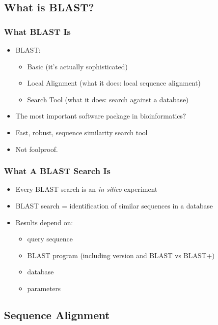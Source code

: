 \documentclass[table]{beamer}
\begin{document}
    \subsection{What is BLAST?}
    \begin{frame}
     \frametitle{What BLAST Is}
     \begin{itemize}
       \item<1-> BLAST:
       \begin{itemize}
         \item<1-> Basic (it's actually sophisticated)
         \item<1-> Local Alignment (what it does: local sequence alignment)
         \item<1-> Search Tool (what it does: search against a database)
       \end{itemize}
       \item<2-> The most important software package in bioinformatics?
       \item<2-> Fast, robust, sequence similarity search tool
       \item<2-> Not foolproof.
     \end{itemize}
    \end{frame}
  
    \begin{frame}
     \frametitle{What A BLAST Search Is}
     \begin{itemize}
       \item Every BLAST search is an \textit{in silico} experiment
       \item BLAST search = identification of similar sequences in a database
       \item Results depend on:
       \begin{itemize}
         \item query sequence
         \item BLAST program (including version and BLAST vs BLAST+)
         \item database
         \item parameters
       \end{itemize}
     \end{itemize}
    \end{frame}  
  
    \subsection{Sequence Alignment}
\end{document}
